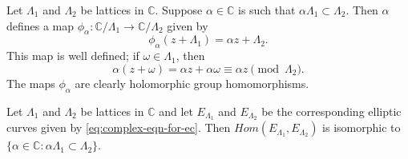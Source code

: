 Let $\Lambda_{1}$ and $\Lambda_{2}$ be lattices in $\mathbb{C}$. Suppose $\alpha \in
\mathbb{C}$ is such that $\alpha\Lambda_{1} \subset \Lambda_{2}$.  Then $\alpha$
defines a map $\phi_{\alpha} \colon \mathbb{C}/\Lambda_{1} \rightarrow
\mathbb{C}/\Lambda_{2}$ given by
\begin{equation}
  \label{eq:phi_alpha}
  \phi_{\alpha}(z + \Lambda_{1}) = \alpha z + \Lambda_{2}.
\end{equation}
This map is well defined; if $\omega \in \Lambda_{1}$, then
\begin{equation*}
  \alpha(z + \omega) = \alpha z + \alpha\omega \equiv \alpha z \pmod{\Lambda_{2}}.
\end{equation*}
The maps $\phi_{\alpha}$ are clearly holomorphic group homomorphisms.

\begin{prop}
  \label{prop:complex-isogenies}
  Let $\Lambda_{1}$ and $\Lambda_{2}$ be lattices in $\mathbb{C}$ and let
  $E_{\Lambda_{1}}$ and $E_{\Lambda_{2}}$ be the corresponding elliptic curves given
  by \eqref{eq:complex-eqn-for-ec}.  Then $Hom(E_{\Lambda_{1}},E_{\Lambda_{2}})$ is
  isomorphic to $\{\alpha \in \mathbb{C} \colon \alpha\Lambda_{1} \subset
  \Lambda_{2}\}$.
\end{prop}

